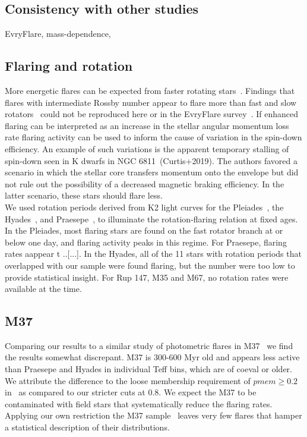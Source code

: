 \documentclass{aa}
\begin{document}
\subsection{Consistency with other studies}
EvryFlare, mass-dependence,
\subsection{Flaring and rotation}
More energetic flares can be expected from faster rotating stars~\citep{candelaresi_superflare_2014, doorsselaere_stellar_2017, yang_flaring_2017}. Findings that flares with intermediate Rossby number appear to flare more than fast and slow rotators~\citep{mondrik_flarerotation_2019} could not be reproduced here or in the EvryFlare survey~\citep{howard_evryflare2arxiv_2019}. If enhanced flaring can be interpreted as an increase in the stellar angular momentum loss rate flaring activity can be used to inform the cause of variation in the spin-down efficiency. An example of such variations is the apparent temporary stalling of spin-down seen in K dwarfs in NGC 6811~(Curtis+2019). The authors favored a scenario in which the stellar core transfers momentum onto the envelope but did not rule out the possibility of a decreased magnetic braking efficiency. In the latter scenario, these stars should flare less. %
\\
We used rotation periods derived from K2 light curves for the Pleiades~\citep{rebull_pleiadesrot_2016}, the Hyades~\citep{douglas_hyadesrot_2016}, and Praesepe~\citep{rebull_praesepe_2017}, to illuminate the rotation-flaring relation at fixed ages. In the Pleiades, most flaring stars are found on the fast rotator branch at or below one day, and flaring activity peaks in this regime. For Praesepe, flaring rates aappear t ..[...]. In the Hyades, all of the 11 stars with rotation periods that overlapped with our sample were found flaring, but the number were too low to provide statistical insight. For Rup 147, M35 and M67, no rotation rates were available at the time.
 \subsection{M37}
Comparing our results to a similar study of photometric flares in M37~\citep{chang_photometric_2015} we find the results somewhat discrepant. M37 is 300-600 Myr old and appears less active than Praesepe and Hyades in individual Teff bins, which are of coeval or older. We attribute the difference to the loose membership requirement of $pmem \geq 0.2$ in~\cite{chang_photometric_2015} as compared to our stricter cuts at 0.8. We expect the M37 to be contaminated with field stars that systematically reduce the flaring rates. Applying our own restriction the M37 sample~\citep{chang_photometric_2015_data} leaves very few flares that hamper a statistical description of their distributions.
\end{document}

